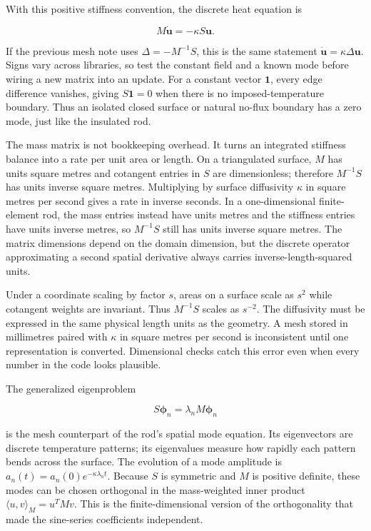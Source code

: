 With this positive stiffness convention, the discrete heat equation is

\[
M\dot{\mathbf u}=-\kappa S\mathbf u.
\]

If the previous mesh note uses \(\Delta=-M^{-1}S\), this is the same statement \(\dot{\mathbf u}=\kappa\Delta\mathbf u\). Signs vary across libraries, so test the constant field and a known mode before wiring a new matrix into an update. For a constant vector \(\mathbf 1\), every edge difference vanishes, giving \(S\mathbf 1=0\) when there is no imposed-temperature boundary. Thus an isolated closed surface or natural no-flux boundary has a zero mode, just like the insulated rod.

The mass matrix is not bookkeeping overhead. It turns an integrated stiffness balance into a rate per unit area or length. On a triangulated surface, \(M\) has units square metres and cotangent entries in \(S\) are dimensionless; therefore \(M^{-1}S\) has units inverse square metres. Multiplying by surface diffusivity \(\kappa\) in square metres per second gives a rate in inverse seconds. In a one-dimensional finite-element rod, the mass entries instead have units metres and the stiffness entries have units inverse metres, so \(M^{-1}S\) still has units inverse square metres. The matrix dimensions depend on the domain dimension, but the discrete operator approximating a second spatial derivative always carries inverse-length-squared units.

Under a coordinate scaling by factor \(s\), areas on a surface scale as \(s^2\) while cotangent weights are invariant. Thus \(M^{-1}S\) scales as \(s^{-2}\). The diffusivity must be expressed in the same physical length units as the geometry. A mesh stored in millimetres paired with \(\kappa\) in square metres per second is inconsistent until one representation is converted. Dimensional checks catch this error even when every number in the code looks plausible.

The generalized eigenproblem

\[
S\boldsymbol\phi_n=\lambda_nM\boldsymbol\phi_n
\]

is the mesh counterpart of the rod's spatial mode equation. Its eigenvectors are discrete temperature patterns; its eigenvalues measure how rapidly each pattern bends across the surface. The evolution of a mode amplitude is \(a_n(t)=a_n(0)e^{-\kappa\lambda_nt}\). Because \(S\) is symmetric and \(M\) is positive definite, these modes can be chosen orthogonal in the mass-weighted inner product \(\langle u,v\rangle_M=u^TMv\). This is the finite-dimensional version of the orthogonality that made the sine-series coefficients independent.

